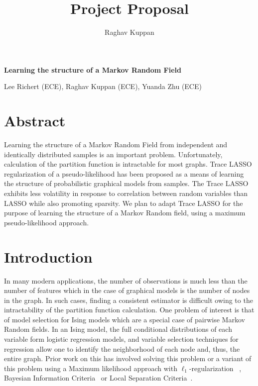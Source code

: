 \documentclass[11pt]{article}
\author{Raghav Kuppan}
\title{Project Proposal}
\begin{document}
\begin{center}
\textbf{\Large Learning the structure of a Markov Random Field}
\end{center}

\begin{center}
Lee Richert (ECE), Raghav Kuppan (ECE), Yuanda Zhu (ECE)
\end{center}



\section{Abstract}

Learning the structure of a Markov Random Field from independent and identically distributed samples is an important problem. Unfortunately, calculation of the partition function is intractable for most graphs. Trace LASSO regularization of a pseudo-likelihood has been proposed as a means of learning the structure of probabilistic graphical models from samples. The Trace LASSO exhibits less volatility in response to correlation between random variables than LASSO while also promoting sparsity. We plan to adapt Trace LASSO for the purpose of learning the structure of a Markov Random field, using a maximum pseudo-likelihood approach.

\section{Introduction}
In many modern applications, the number of observations is much less than the number of features which in the case of graphical models is the number of nodes in the graph. In such cases, finding a consistent estimator is difficult owing to the intractability of the partition function calculation. One problem of interest is that of model selection for Ising models which are a special case of pairwise Markov Random fields. In an Ising model, the full conditional distributions of each variable form logistic regression models, and variable selection techniques for regression allow one to identify the neighborhood of each node and, thus, the entire graph. Prior work on this has involved solving this problem or a variant of this problem using a Maximum likelihood approach with $\ell_1$-regularization ~\cite{ravikumar2010high}, Bayesian Information Criteria~\cite{barber2015high} or Local Separation Criteria~\cite{anandkumar2012high}.\\
\end{document}
